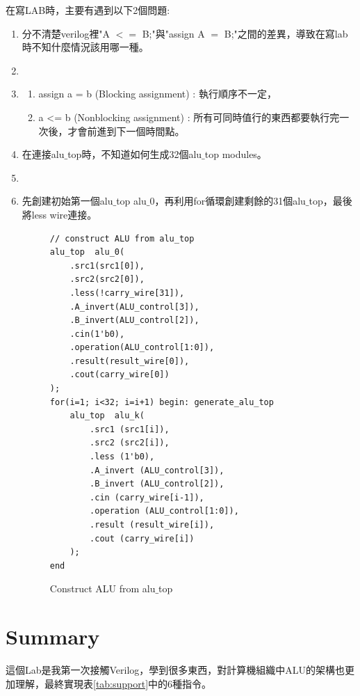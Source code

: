 \documentclass[12pt,a4paper]{article}
\makeatletter
\newtheorem*{solution}{Solution}
\theoremstyle{definition}
\renewenvironment{solution}[1][Solution] {\par\pushQED{\qed}\normalfont\topsep6\p@\@plus6\p@\relax\trivlist\item[\hskip\labelsep\bfseries#1\@addpunct{.}]\ignorespaces}{\popQED\endtrivlist\@endpefalse} \makeatother
\makeatother
\begin{document}
在寫LAB時，主要有遇到以下2個問題:
\begin{enumerate}
\item 分不清楚verilog裡"A $<=$ B;"與"assign A $=$ B;"之間的差異，導致在寫lab時不知什麼情況該用哪一種。
\begin{solution}
\item
\begin{enumerate}
\item assign a = b (Blocking assignment) : 執行順序不一定，
\item a <= b (Nonblocking assignment) : 所有可同時值行的東西都要執行完一次後，才會前進到下一個時間點。
\end{enumerate}
\end{solution}

\item 在連接alu$\_$top時，不知道如何生成32個alu$\_$top modules。
\begin{solution}
\item 先創建初始第一個alu$\_$top alu$\_$0，再利用for循環創建剩餘的31個alu$\_$top，最後將less wire連接。

\begin{figure}[H]
\centering
\begin{lstlisting}[caption={}]
// construct ALU from alu_top
alu_top  alu_0(
    .src1(src1[0]),
    .src2(src2[0]),
    .less(!carry_wire[31]),
    .A_invert(ALU_control[3]),
    .B_invert(ALU_control[2]),
    .cin(1'b0),
    .operation(ALU_control[1:0]),
    .result(result_wire[0]),
    .cout(carry_wire[0])
);
for(i=1; i<32; i=i+1) begin: generate_alu_top
    alu_top  alu_k(
        .src1 (src1[i]),
        .src2 (src2[i]),
        .less (1'b0),
        .A_invert (ALU_control[3]),
        .B_invert (ALU_control[2]),
        .cin (carry_wire[i-1]),
        .operation (ALU_control[1:0]),
        .result (result_wire[i]),
        .cout (carry_wire[i])
    );
end
\end{lstlisting}
\caption{Construct ALU from alu$\_$top}
\label{fig:construct}
\end{figure}
\end{solution}

\end{enumerate}

\section{Summary}


這個Lab是我第一次接觸Verilog，學到很多東西，對計算機組織中ALU的架構也更加理解，最終實現表\ref{tab:support}中的6種指令。
\end{document}
